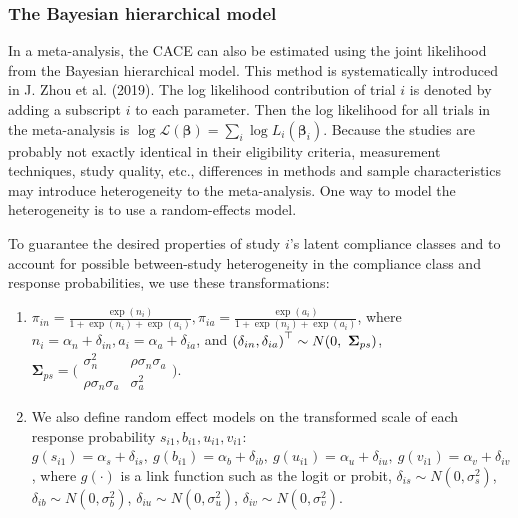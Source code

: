 \hypertarget{the-bayesian-hierarchical-model}{%
\subsubsection{The Bayesian hierarchical model}\label{the-bayesian-hierarchical-model}}

In a meta-analysis, the CACE can also be estimated using the joint likelihood from the Bayesian hierarchical model. This method is systematically introduced in J. Zhou et al. (2019). The log likelihood contribution of trial \(i\) is denoted
by adding a subscript \(i\) to each parameter. Then the log likelihood for all trials in the meta-analysis is \(\log\mathcal{L}(\boldsymbol{\beta})=\sum_i {\log L_i({\boldsymbol{\beta}}_{i})}\).
Because the studies are probably not exactly identical in their eligibility criteria, measurement techniques, study quality, etc., differences in methods and sample characteristics may introduce heterogeneity to the meta-analysis. One way to model the heterogeneity is to use a random-effects model.

To guarantee the desired properties of study \(i\)'s latent compliance classes and to account for possible between-study heterogeneity in the compliance class and response probabilities, we use these transformations:

\begin{enumerate}
\def\labelenumi{\arabic{enumi}.}
\tightlist
\item
  \(\pi_{in}=\frac{\exp(n_i)}{1+\exp(n_i)+\exp(a_i)}, \pi_{ia}=\frac{\exp(a_i)}{1+\exp(n_i)+\exp(a_i)}\), where \(n_i=\alpha_{n}+\delta_{in}, a_i=\alpha_{a}+\delta_{ia}\), and \(\\ {(\delta_{in}, \delta_{ia})}^\top \sim N(0, \ {\mathbf{\Sigma}}_{ps})\), \(\mathbf{\Sigma}_{ps}=\bigl(\begin{smallmatrix} {\sigma}^2_{n} & \rho {\sigma}_{n}{\sigma}_{a} \\ \rho {\sigma}_{n}{\sigma}_{a} & {\sigma}^2_{a} \end{smallmatrix} \bigr)\).
\item
  We also define random effect models on the transformed scale of each response probability \(s_{i1}, b_{i1}, u_{i1}, v_{i1}\):
  \(g(s_{i1})=\alpha_s+\delta_{is}, \ g(b_{i1})=\alpha_b+\delta_{ib}, \ g(u_{i1})=\alpha_u+\delta_{iu}, \ g(v_{i1})=\alpha_v+\delta_{iv}\), where \(g(\cdot)\) is a link function such as the logit or probit, \(\delta_{is} \sim N(0,{\sigma}_{s}^2)\), \(\delta_{ib} \sim N(0,{\sigma}_{b}^2)\), \(\delta_{iu} \sim N(0,{\sigma}^2_{u})\), \(\delta_{iv} \sim N(0,{\sigma}^2_{v})\).
\end{enumerate}

